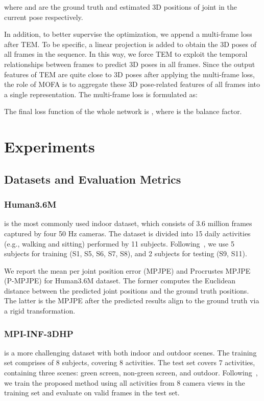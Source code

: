 \documentclass[]{llncs}
\begin{document}
where  and  are the ground truth and estimated 3D positions of  joint in the current pose respectively.

In addition, to better supervise the optimization, we append a multi-frame loss~\cite{li2022exploiting} after TEM. To be specific, a linear projection is added to obtain the 3D poses of all frames in the sequence. In this way, we force TEM to exploit the temporal relationships between frames to predict 3D poses in all frames. Since the output features of TEM are quite close to 3D poses after applying the multi-frame loss, the role of MOFA is to aggregate these 3D pose-related features of all frames into a single representation. The multi-frame loss is formulated as: 

The final loss function of the whole network is , where  is the balance factor.



\section{Experiments}
\subsection{Datasets and Evaluation Metrics}


\subsubsection{Human3.6M~\cite{ionescu2013human3}} is the most commonly used indoor dataset, which consists of 3.6 million frames captured by four 50 Hz cameras. The dataset is divided into 15 daily activities (e.g., walking and sitting) performed by 11 subjects. Following~\cite{pavllo20193d,shan2021improving,cai2019exploiting}, we use 5 subjects for training (S1, S5, S6, S7, S8), and 2 subjects for testing (S9, S11). 

We report the mean per joint position error (MPJPE) and Procrustes MPJPE (P-MPJPE) for Human3.6M dataset. The former computes the Euclidean distance between the predicted joint positions and the ground truth positions. The latter is the MPJPE after the predicted results align to the ground truth via a rigid transformation.

\subsubsection{MPI-INF-3DHP~\cite{mehta2017monocular}} is a more challenging dataset with both indoor and outdoor scenes. The training set comprises of 8 subjects, covering 8 activities. The test set covers 7 activities, containing three scenes: green screen, non-green screen, and outdoor.  Following~\cite{zheng20213d,chen2021anatomy}, we train the proposed method using all activities from 8 camera views in the training set and evaluate on valid frames in the test set.
\end{document}
